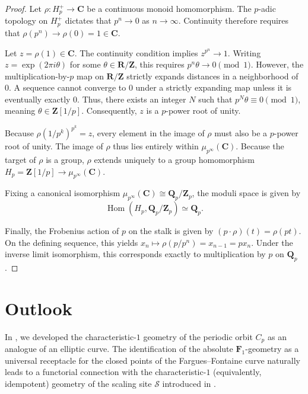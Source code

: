 \documentclass[11pt,a4paper]{article}
\newcommand{\C}{\mathbf{C}}
\newcommand{\Q}{\mathbf{Q}}
\newcommand{\R}{\mathbf{R}}
\newcommand{\Z}{\mathbf{Z}}
\newcommand{\Fone}{\mathbf{F}_{1}}
\begin{document}
\begin{proof}
Let $\rho : H_p^+ \to \C$ be a continuous monoid homomorphism. The $p$-adic topology on $H_p^+$ dictates that $p^n \to 0$ as $n \to \infty$. Continuity therefore requires that $\rho(p^n) \to \rho(0) = 1\in \C$. 

Let $z = \rho(1) \in \C$. The continuity condition implies $z^{p^n} \to 1$. Writing $z = \exp(2\pi i \theta)$ for some $\theta \in \R/\Z$, this requires $p^n \theta \to 0 \pmod 1$. However, the multiplication-by-$p$ map on $\R/\Z$ strictly expands distances in a neighborhood of $0$. A sequence cannot converge to $0$ under a strictly expanding map unless it is eventually exactly $0$. Thus, there exists an integer $N$ such that $p^N \theta \equiv 0 \pmod 1$, meaning $\theta \in \Z[1/p]$. Consequently, $z$ is a $p$-power root of unity. 

Because $\rho(1/p^k)^{p^k} = z$, every element in the image of $\rho$ must also be a $p$-power root of unity. The image of $\rho$ thus lies entirely within $\mu_{p^\infty}(\C)$. Because the target of $\rho$ is a group, $\rho$ extends uniquely to a group homomorphism  $H_p = \Z[1/p]\to \mu_{p^\infty}(\C)$. 

Fixing a canonical isomorphism $\mu_{p^\infty}(\C) \cong \Q_p/\Z_p$, the moduli space is given by $$\operatorname{Hom}(H_p, \Q_p/\Z_p)\simeq \Q_p.$$ 

Finally, the Frobenius action of $p$ on the stalk is given by $(p \cdot \rho)(t) = \rho(pt)$. On the defining sequence, this yields $x_n \mapsto \rho(p/p^n) = x_{n-1} = p x_n$. Under the inverse limit isomorphism, this corresponds exactly to multiplication by $p$ on $\Q_p$.
\end{proof}




\section{Outlook}\label{outlook}

In \cite{CC3}, we developed the characteristic-$1$ geometry of the periodic orbit $C_p$ as an analogue of an elliptic curve. The identification of the absolute $\Fone$-geometry as a universal receptacle for the closed points of the Fargues–Fontaine curve naturally leads to a functorial connection with the characteristic-$1$ (equivalently, idempotent) geometry of the scaling site $\mathscr S$ introduced in \cite{CC3}.
\end{document}
